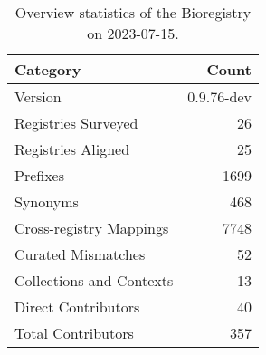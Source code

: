 \begin{table}
\caption{Overview statistics of the Bioregistry on 2023-07-15.}
\label{tab:bioregistry-summary}
\begin{tabular}{lr}
\toprule
Category & Count \\
\midrule
Version & 0.9.76-dev \\
Registries Surveyed & 26 \\
Registries Aligned & 25 \\
Prefixes & 1699 \\
Synonyms & 468 \\
Cross-registry Mappings & 7748 \\
Curated Mismatches & 52 \\
Collections and Contexts & 13 \\
Direct Contributors & 40 \\
Total Contributors & 357 \\
\bottomrule
\end{tabular}
\end{table}
